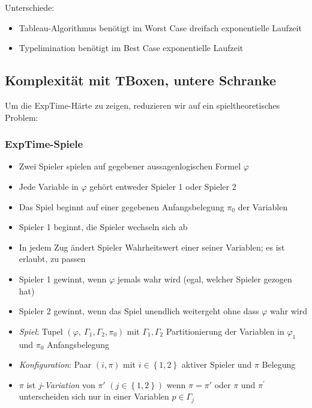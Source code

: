 Unterschiede:

\begin{itemize}
  \item Tableau-Algorithmus benötigt im Worst Case dreifach exponentielle Laufzeit
  \item Typelimination benötigt im Best Case exponentielle Laufzeit
\end{itemize}

\subsection{Komplexität mit TBoxen, untere Schranke}\label{komplexituxe4t-mit-tboxen-untere-schranke}

Um die ExpTime-Härte zu zeigen, reduzieren wir auf ein spieltheoretisches Problem:

\subsubsection{ExpTime-Spiele}\label{exptime-spiele}

\begin{itemize}
\item
  Zwei Spieler spielen auf gegebener aussagenlogischen Formel
  $\varphi$
\item
  Jede Variable in $\varphi$ gehört entweder Spieler 1 oder Spieler 2
\item
  Das Spiel beginnt auf einer gegebenen Anfangsbelegung $\pi_{0}$ der
  Variablen
\item
  Spieler 1 beginnt, die Spieler wechseln sich ab
\item
  In jedem Zug ändert Spieler Wahrheitswert einer seiner Variablen; es
  ist erlaubt, zu passen
\item
  Spieler 1 gewinnt, wenn $\varphi$ jemals wahr wird (egal, welcher
  Spieler gezogen hat)
\item
  Spieler 2 gewinnt, wenn das Spiel unendlich weitergeht ohne dass
  $\varphi$ wahr wird
\end{itemize}

\begin{definition}

\begin{itemize}
\item
  \emph{Spiel}: Tupel
  $\left( \varphi,\ \Gamma_1,\Gamma_2,\pi_{0} \right)$ mit
  $\Gamma_1,\Gamma_2$ Partitionierung der Variablen in
  $\varphi_1$ und $\pi_{0}$ Anfangsbelegung
\item
  \emph{Konfiguration}: Paar $(i,\pi)$ mit
  $i \in \left\{ 1,2 \right\}$ aktiver Spieler und $\pi$ Belegung
\item
  $\pi$ ist $j$-\emph{Variation} von $\pi'$
  $\left( j \in \left\{ 1,2 \right\} \right)$ wenn $\pi = \pi'$ oder
  $\pi$ und $\pi^{'}$ unterscheiden sich nur in einer Variablen
  $p \in \Gamma_{j}$
\end{itemize}
\end{definition}

